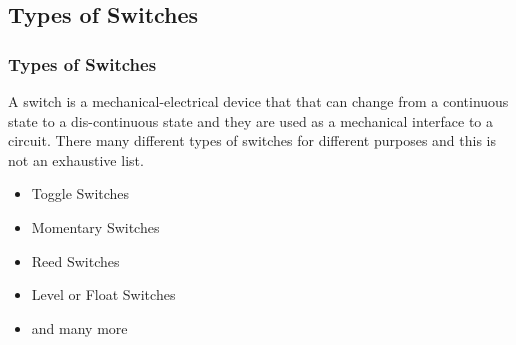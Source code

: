 \documentclass[fleqn]{beamer} %
\newcommand{\sectionIsubsectionIVtitle}{Types of Switches}
\begin{document}
		\subsection{\sectionIsubsectionIVtitle}\label{sectionIsubsectionIV}	

			\begin{frame}
				\frametitle{\sectionIsubsectionIVtitle}

				A switch is a mechanical-electrical device that that can change from a continuous state to a dis-continuous state and they are used as a mechanical interface to a circuit. There many different types of switches for different purposes and this is not an exhaustive list.

				\begin{itemize}
				\item Toggle Switches
				\item Momentary Switches
				\item Reed Switches
				\item Level or Float Switches
				\item and many more
				\end{itemize}
				
			\end{frame}
\end{document}

